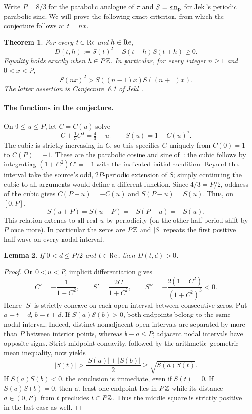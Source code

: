 \documentclass[11pt,a4paper]{article}
\newtheorem{SourceRcaMtheorem}{Theorem}
\newtheorem{SourceRcaMlemma}[SourceRcaMtheorem]{Lemma}
\begin{document}
Write $P=8/3$ for the parabolic analogue of $\pi$ and $S=\sin_{\rm p}$
for Jekl's periodic parabolic sine. We will prove the following exact
criterion, from which the conjecture follows at $t=nx$.

\begin{SourceRcaMtheorem}\label{R20M:thm}
For every $t\in\operatorname{Re}$ and $h\in\operatorname{Re}$,
\[
 D(t,h):=S(t)^2-S(t-h)S(t+h)\ge0.
\]
Equality holds exactly when $h\in P\mathbb Z$. In particular, for every
integer $n\ge1$ and $0<x<P$,
\[
 S(nx)^2>S((n-1)x)S((n+1)x).
\]
The latter assertion is Conjecture~6.1 of Jekl~\cite[p.~736]{R20M:jekl}.
\end{SourceRcaMtheorem}

\paragraph{The functions in the conjecture.}
On $0\le u\le P$, let $C=C(u)$ solve
\[
 C+\tfrac13 C^3=\tfrac43-u,\qquad S(u)=1-C(u)^2.
\]
The cubic is strictly increasing in $C$, so this specifies $C$ uniquely
from $C(0)=1$ to $C(P)=-1$. These are the parabolic cosine and sine
of~\cite[Section~2]{R20M:jekl}: the cubic follows by integrating
$(1+C^2)C'=-1$ with the indicated initial condition. Beyond this
interval take the source's odd, $2P$-periodic extension of $S$; simply
continuing the cubic to all arguments would define a different function.
Since $4/3=P/2$, oddness of the cubic gives $C(P-u)=-C(u)$ and
$S(P-u)=S(u)$. Thus, on $[0,P]$,
\[
 S(u+P)=S(u-P)=-S(P-u)=-S(u).
\]
This relation extends to all real $u$ by periodicity (on the other
half-period shift by $P$ once more). In particular the zeros are $P\mathbb Z$
and $|S|$ repeats the first positive half-wave on every nodal interval.


\begin{SourceRcaMlemma}\label{R20M:lemma}
If $0<d\le P/2$ and $t\in\operatorname{Re}$, then $D(t,d)>0$.
\end{SourceRcaMlemma}
\begin{proof}
On $0<u<P$, implicit differentiation gives
\[
 C'=-\frac{1}{1+C^2},\qquad S'=\frac{2C}{1+C^2},\qquad
 S''=-\frac{2(1-C^2)}{(1+C^2)^3}<0 .
\]
Hence $|S|$ is strictly concave on each open interval between consecutive
zeros. Put $a=t-d$, $b=t+d$. If $S(a)S(b)>0$, both endpoints
belong to the same nodal interval. Indeed, distinct nonadjacent open
intervals are separated by more than $P$ between interior points,
whereas $b-a\le P$; adjacent nodal intervals have opposite signs.
Strict midpoint concavity, followed by the arithmetic--geometric mean
inequality, now yields
\[
 |S(t)|>\frac{|S(a)|+|S(b)|}{2}\ge\sqrt{S(a)S(b)}.
\]
If $S(a)S(b)<0$, the conclusion is immediate, even if $S(t)=0$.
If $S(a)S(b)=0$, then at least one endpoint lies in $P\mathbb Z$ while
its distance $d\in(0,P)$ from $t$ precludes $t\in P\mathbb Z$. Thus the
middle square is strictly positive in the last case as well.
\end{proof}
\end{document}
